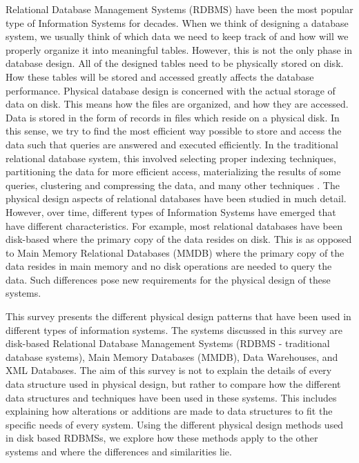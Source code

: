\documentclass[12pt,a4paper]{article}
\begin{document}
Relational Database Management Systems (RDBMS) have been the most popular type of Information Systems for decades. When we think of designing a database system,
we usually think of which data we need to keep track of and how will we properly organize it into meaningful tables. However, this is not the only phase in
database design. All of the designed tables need to be physically stored on disk. How these tables will be stored and accessed greatly affects the database
performance. Physical database design is concerned with the actual storage of data on disk. This means how the files are organized, and how they are accessed.
Data is stored in the form of records in files which reside on a physical disk. In this sense, we try to find the most efficient way possible to store and
access the data such that queries are answered and executed efficiently. In the traditional relational database system, this involved selecting proper indexing
techniques, partitioning the data for more efficient access, materializing the results of some queries, clustering and compressing the data, and many other
techniques \cite{finkelstein1988physical,lightstone2007physical}. The physical design aspects of relational databases have been studied in much detail. However,
over time, different types of Information Systems have emerged that have different characteristics. For example, most relational databases have been disk-based
where the primary copy of the data resides on disk. This is as opposed to Main Memory Relational Databases (MMDB) where the primary copy of the data resides in
main memory and no disk operations are needed to query the data. Such differences pose new requirements for the physical design of these systems.

This survey presents the different physical design patterns that have been used in different types of information systems. The systems discussed in this survey
are disk-based Relational Database Management Systems (RDBMS - traditional database systems), Main Memory Databases (MMDB), Data Warehouses, and XML
Databases. The aim of this survey
is not to explain the details of every data structure used in physical design, but rather to compare how the different data structures and techniques have been
used in these
systems. This includes explaining how alterations or additions are made to data structures to fit the specific needs of every system. Using the different
physical design methods used in disk based RDBMSs, we explore how these methods apply to the other systems and where the differences and similarities lie.
\end{document}
